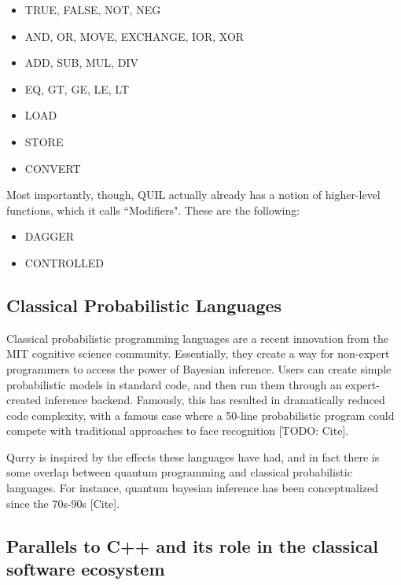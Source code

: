 \documentclass[a4paper,twocolumn,11pt,accepted=2017-05-09]{quantumarticle}
\begin{document}
\begin{itemize}
    \item TRUE, FALSE, NOT, NEG %
    \item AND, OR, MOVE, EXCHANGE, IOR, XOR %
    \item ADD, SUB, MUL, DIV %
    \item EQ, GT, GE, LE, LT %
    \item LOAD %
    \item STORE %
    \item CONVERT %
\end{itemize}

Most importantly, though, QUIL actually already has a notion of higher-level functions, which it calls ``Modifiers".
These are the following:
\begin{itemize}
    \item DAGGER
    \item CONTROLLED
\end{itemize}

\subsection{Classical Probabilistic Languages}

 Classical probabilistic programming languages are a recent innovation from the MIT cognitive science community. 
 Essentially, they create a way for non-expert programmers to access the power of Bayesian inference. 
 Users can create simple probabilistic models in standard code, and then run them through an expert-created inference backend.
 Famously, this has resulted in dramatically reduced code complexity, with a famous case where a 50-line probabilistic program could compete with traditional approaches to face recognition [TODO: Cite].

 Qurry is inspired by the effects these languages have had, and in fact there is some overlap between quantum programming and classical probabilistic languages.
 For instance, quantum bayesian inference has been conceptualized since the 70s-90s [Cite].

\subsection{Parallels to C++ and its role in the classical software ecosystem}
\end{document}
